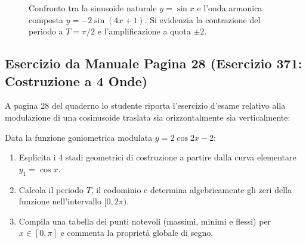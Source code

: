\documentclass[11pt,a4paper,oneside]{report}
\begin{document}
\begin{figure}[htbp]
\centering
{}
\caption{Confronto tra la sinusoide naturale $y = \sin x$ e l'onda armonica composta $y = -2\sin(4x + 1)$. Si evidenzia la contrazione del periodo a $T = \pi/2$ e l'amplificazione a quota $\pm 2$.}
\label{fig:onda_armonica}
\end{figure}


\subsection{Esercizio da Manuale Pagina 28 (Esercizio 371: Costruzione a 4 Onde)}
A pagina 28 del quaderno lo studente riporta l'esercizio d'esame relativo alla modulazione di una cosinusoide traslata sia orizzontalmente sia verticalmente:

\begin{esercizio}[Decomposizione per Passi Successivi di $y = 2\cos 2x - 2$]
Data la funzione goniometrica modulata $y = 2\cos 2x - 2$:
\begin{enumerate}[label=\alph*.]
    \item Esplicita i 4 stadi geometrici di costruzione a partire dalla curva elementare $y_1 = \cos x$.
    \item Calcola il periodo $T$, il codominio e determina algebricamente gli zeri della funzione nell'intervallo $[0, 2\pi)$.
    \item Compila una tabella dei punti notevoli (massimi, minimi e flessi) per $x \in [0, \pi]$ e commenta la proprietà globale di segno.
\end{enumerate}
\end{esercizio}
\end{document}
